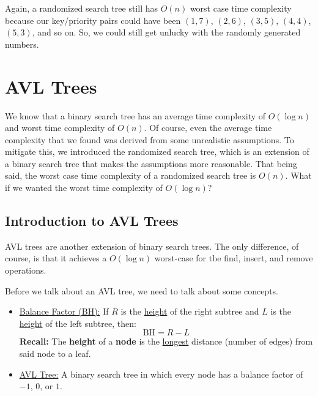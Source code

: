 \documentclass[letterpaper]{article}
\begin{document}
\bigskip 

Again, a randomized search tree still has $O(n)$ worst case time complexity because our key/priority pairs could have been $(1, 7)$, $(2, 6)$, $(3, 5)$, $(4, 4)$, $(5, 3)$, and so on. So, we could still get unlucky with the randomly generated numbers. 






\newpage
\section{AVL Trees}
We know that a binary search tree has an average time complexity of $O(\log n)$ and worst time complexity of $O(n)$. Of course, even the average time complexity that we found was derived from some unrealistic assumptions. To mitigate this, we introduced the randomized search tree, which is an extension of a binary search tree that makes the assumptions more reasonable. That being said, the worst case time complexity of a randomized search tree is $O(n)$. What if we wanted the worst time complexity of $O(\log n)$? 

\subsection{Introduction to AVL Trees}
AVL trees are another extension of binary search trees. The only difference, of course, is that it achieves a $O(\log n)$ worst-case for tbe find, insert, and remove operations.

\bigskip 

Before we talk about an AVL tree, we need to talk about some concepts. 
\begin{itemize}
    \item \underline{Balance Factor (BH):} If $R$ is the \underline{height} of the right subtree and $L$ is the \underline{height} of the left subtree, then: 
    \[\text{BH} = R - L\]
    \textbf{Recall:} The \textbf{height} of a \textbf{node} is the \underline{longest} distance (number of edges) from said node to a leaf. 

    \item \underline{AVL Tree:} A binary search tree in which every node has a balance factor of $-1$, $0$, or $1$. 
\end{itemize}
\end{document}
